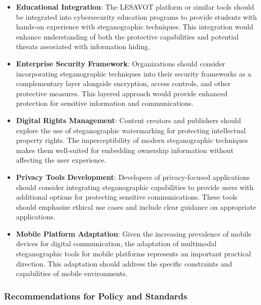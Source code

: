 \documentclass[12pt, a4paper, oneside]{book}
\begin{document}
\begin{itemize}[leftmargin=*]
    \item \textbf{Educational Integration}: The LESAVOT platform or similar tools should be integrated into cybersecurity education programs to provide students with hands-on experience with steganographic techniques. This integration would enhance understanding of both the protective capabilities and potential threats associated with information hiding.

    \item \textbf{Enterprise Security Framework}: Organizations should consider incorporating steganographic techniques into their security frameworks as a complementary layer alongside encryption, access controls, and other protective measures. This layered approach would provide enhanced protection for sensitive information and communications.

    \item \textbf{Digital Rights Management}: Content creators and publishers should explore the use of steganographic watermarking for protecting intellectual property rights. The imperceptibility of modern steganographic techniques makes them well-suited for embedding ownership information without affecting the user experience.

    \item \textbf{Privacy Tools Development}: Developers of privacy-focused applications should consider integrating steganographic capabilities to provide users with additional options for protecting sensitive communications. These tools should emphasize ethical use cases and include clear guidance on appropriate applications.

    \item \textbf{Mobile Platform Adaptation}: Given the increasing prevalence of mobile devices for digital communication, the adaptation of multimodal steganographic tools for mobile platforms represents an important practical direction. This adaptation should address the specific constraints and capabilities of mobile environments.
\end{itemize}

\subsubsection{Recommendations for Policy and Standards}
\end{document}
